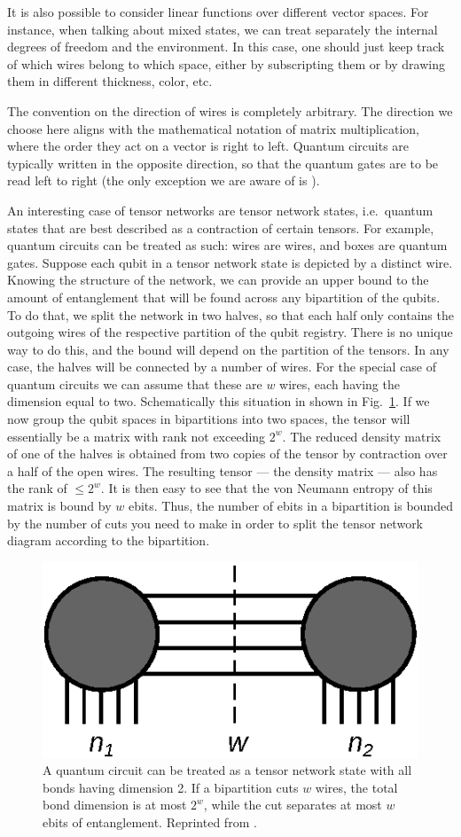 It is also possible to consider linear functions over different vector spaces. For instance, when talking about mixed states, we can treat separately the internal degrees of freedom and the environment. In this case, one should just keep track of which wires belong to which space, either by subscripting them or by drawing them in different thickness, color, etc.

The convention on the direction of wires is completely arbitrary. The direction we choose here aligns with the mathematical notation of matrix multiplication, where the order they act on a vector is right to left. Quantum circuits are typically written in the opposite direction, so that the quantum gates are to be read left to right (the only exception we are aware of is \cite{kitaev_classical_2002}).

An interesting case of tensor networks are tensor network states, i.e.~quantum states that are best described as a contraction of certain tensors. For example, quantum circuits can be treated as such: wires are wires, and boxes are quantum gates. Suppose each qubit in a tensor network state is depicted by a distinct wire. Knowing the structure of the network, we can provide an upper bound to the amount of entanglement that will be found across any bipartition of the qubits. To do that, we split the network in two halves, so that each half only contains the outgoing wires of the respective partition of the qubit registry. There is no unique way to do this, and the bound will depend on the partition of the tensors. In any case, the halves will be connected by a number of wires. For the special case of quantum circuits we can assume that these are $w$ wires, each having the dimension equal to two. Schematically this situation in shown in Fig.~\ref{fig:cut}. If we now group the qubit spaces in bipartitions into two spaces, the tensor will essentially be a matrix with rank not exceeding $2^w$. The reduced density matrix of one of the halves is obtained from two copies of the tensor by contraction over a half of the open wires. The resulting tensor --- the density matrix --- also has the rank of $\leq 2^w$. It is then easy to see that the von Neumann entropy of this matrix is bound by $w$ ebits. Thus, the number of ebits in a bipartition is bounded by the number of cuts you need to make in order to split the tensor network diagram according to the bipartition.

\begin{figure}
    \centering
    \includegraphics[width=0.5\linewidth]{figures/drawing_2.eps}
    \caption{A quantum circuit can be treated as a tensor network state with all bonds having dimension 2. If a bipartition cuts $w$ wires, the total bond dimension is at most $2^w$, while the cut separates at most $w$ ebits of entanglement. Reprinted from \cite{uvarov_machine_2020}.}
    \label{fig:cut}
\end{figure}

